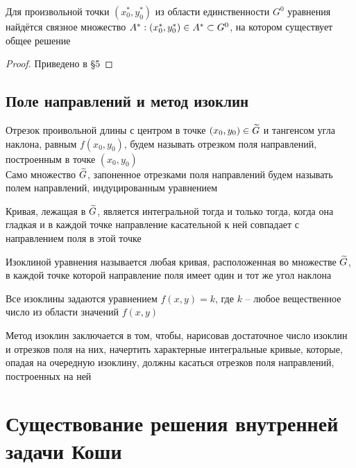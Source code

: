 \begin{theorem}\label{th:comm:exist}
    Для произвольной точки $ (x_0^*, y_0^*) $ из области единственности $ G^0 $ уравнения  найдётся связное множество $ A^* : (x_0^*, y_0^*) \in A^* \subset G^0 $, на котором существует общее решение
\end{theorem}

\begin{proof}
	Приведено в \S5
\end{proof}

\subsection{Поле направлений и метод изоклин}

\begin{definition}
    Отрезок проивольной длины с центром в точке $ (x_0, y_0) \in \widetilde{G} $ и тангенсом угла наклона, равным $ f(x_0, y_0) $, будем называть отрезком поля направлений, построенным в точке $ (x_0, y_0) $ \\
    Само множество $ \widetilde{G} $, запоненное отрезками поля направлений будем называть полем направлений, индуцированным уравнением 
\end{definition}

Кривая, лежащая в $ \widetilde{G} $, является интегральной тогда и только тогда, когда она гладкая и в каждой точке направление касательной к ней совпадает с направлением поля в этой точке

\begin{definition}
    Изоклиной уравнения  называется любая кривая, расположенная во множестве $ \widetilde{G} $, в каждой точке которой направление поля имеет один и тот же угол наклона
\end{definition}

\begin{remark}
	Все изоклины задаются уравнением $ f(x, y) = k $, где $ k $ -- любое вещественное число из области значений $ f(x, y) $
\end{remark}

Метод изоклин заключается в том, чтобы, нарисовав достаточное число изоклин и отрезков поля на них, начертить характерные интегральные кривые, которые, опадая на очередную изоклину, должны касаться отрезков поля направлений, построенных на ней

\section{Существование решения внутренней задачи Коши}

